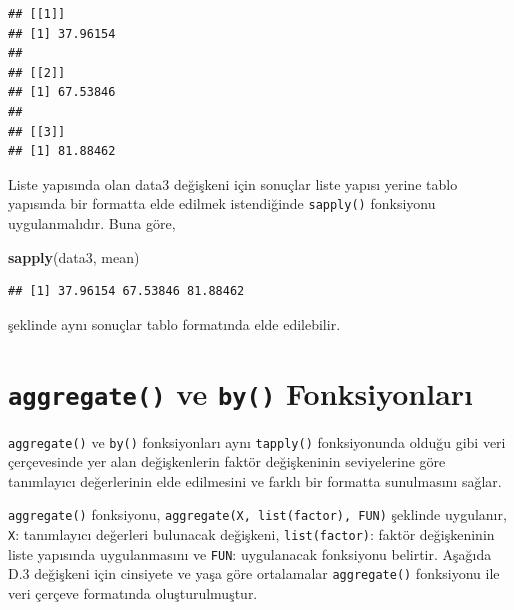 \documentclass[
]{book}
\newenvironment{Shaded}{\begin{snugshade}}{\end{snugshade}}
\newcommand{\CommentTok}[1]{\textcolor[rgb]{0.56,0.35,0.01}{\textit{#1}}}
\newcommand{\FloatTok}[1]{\textcolor[rgb]{0.00,0.00,0.81}{#1}}
\newcommand{\FunctionTok}[1]{\textcolor[rgb]{0.13,0.29,0.53}{\textbf{#1}}}
\newcommand{\NormalTok}[1]{#1}
\newcommand{\SpecialCharTok}[1]{\textcolor[rgb]{0.81,0.36,0.00}{\textbf{#1}}}
\begin{document}
\begin{verbatim}
## [[1]]
## [1] 37.96154
## 
## [[2]]
## [1] 67.53846
## 
## [[3]]
## [1] 81.88462
\end{verbatim}

Liste yapısında olan data3 değişkeni için sonuçlar liste yapısı yerine tablo yapısında bir formatta elde edilmek istendiğinde \texttt{sapply()} fonksiyonu uygulanmalıdır. Buna göre,

\begin{Shaded}
\begin{Highlighting}[]
\FunctionTok{sapply}\NormalTok{(data3, mean)}
\end{Highlighting}
\end{Shaded}

\begin{verbatim}
## [1] 37.96154 67.53846 81.88462
\end{verbatim}

şeklinde aynı sonuçlar tablo formatında elde edilebilir.

\section{\texorpdfstring{\texttt{aggregate()} ve \texttt{by()} Fonksiyonları}{aggregate() ve by() Fonksiyonları}}\label{aggregate-ve-by-fonksiyonlarux131}

\texttt{aggregate()} ve \texttt{by()} fonksiyonları aynı \texttt{tapply()} fonksiyonunda olduğu gibi veri çerçevesinde yer alan değişkenlerin faktör değişkeninin seviyelerine göre tanımlayıcı değerlerinin elde edilmesini ve farklı bir formatta sunulmasını sağlar.

\texttt{aggregate()} fonksiyonu, \texttt{aggregate(X,\ list(factor),\ FUN)} şeklinde uygulanır, \texttt{X}: tanımlayıcı değerleri bulunacak değişkeni, \texttt{list(factor)}: faktör değişkeninin liste yapısında uygulanmasını ve \texttt{FUN}: uygulanacak fonksiyonu belirtir. Aşağıda D.3 değişkeni için cinsiyete ve yaşa göre ortalamalar \texttt{aggregate()} fonksiyonu ile veri çerçeve formatında oluşturulmuştur.

\begin{Shaded}
\end{Shaded}
\end{document}
